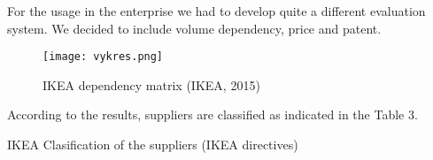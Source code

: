 \documentclass[oneside,12pt]{article}%
\begin{document}
For the usage in the enterprise we had to develop quite a different evaluation system. We decided to include volume dependency, price and patent.


\begin{figure}[ht!]
  \texttt{[image: vykres.png]}
  \caption{IKEA dependency matrix (IKEA, 2015)}
\end{figure}


According to the results, suppliers are classified as indicated in the Table 3.


\begin{table}[h]
  \centering
  \caption{IKEA Clasification of the suppliers (IKEA directives)}
  \vspace{10mm}
  \scalebox{0.7}{

}
\end{table}
\end{document}
